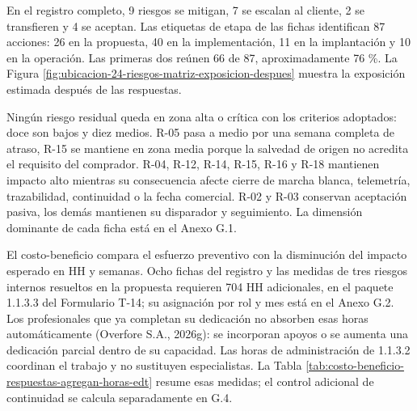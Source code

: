 \documentclass[subdoc]{../../comun/overfore}
\begin{document}
En el registro completo, 9 riesgos se mitigan, 7 se escalan al cliente, 2 se transfieren y 4 se aceptan. Las etiquetas de etapa de las fichas identifican 87 acciones: 26 en la propuesta, 40 en la implementación, 11 en la implantación y 10 en la operación. Las primeras dos reúnen 66 de 87, aproximadamente 76 \%. La Figura \ref{fig:ubicacion-24-riesgos-matriz-exposicion-despues} muestra la exposición estimada después de las respuestas.

Ningún riesgo residual queda en zona alta o crítica con los criterios adoptados: doce son bajos y diez medios. R-05 pasa a medio por una semana completa de atraso, R-15 se mantiene en zona media porque la salvedad de origen no acredita el requisito del comprador. R-04, R-12, R-14, R-15, R-16 y R-18 mantienen impacto alto mientras su consecuencia afecte cierre de marcha blanca, telemetría, trazabilidad, continuidad o la fecha comercial. R-02 y R-03 conservan aceptación pasiva, los demás mantienen su disparador y seguimiento. La dimensión dominante de cada ficha está en el Anexo G.1.

El costo-beneficio compara el esfuerzo preventivo con la disminución del impacto esperado en HH y semanas. Ocho fichas del registro y las medidas de tres riesgos internos resueltos en la propuesta requieren 704 HH adicionales, en el paquete 1.1.3.3 del Formulario T-14; su asignación por rol y mes está en el Anexo G.2. Los profesionales que ya completan su dedicación no absorben esas horas automáticamente (Overfore S.A., 2026g): se incorporan apoyos o se aumenta una dedicación parcial dentro de su capacidad. Las horas de administración de 1.1.3.2 coordinan el trabajo y no sustituyen especialistas. La Tabla \ref{tab:costo-beneficio-respuestas-agregan-horas-edt} resume esas medidas; el control adicional de continuidad se calcula separadamente en G.4.
\end{document}
